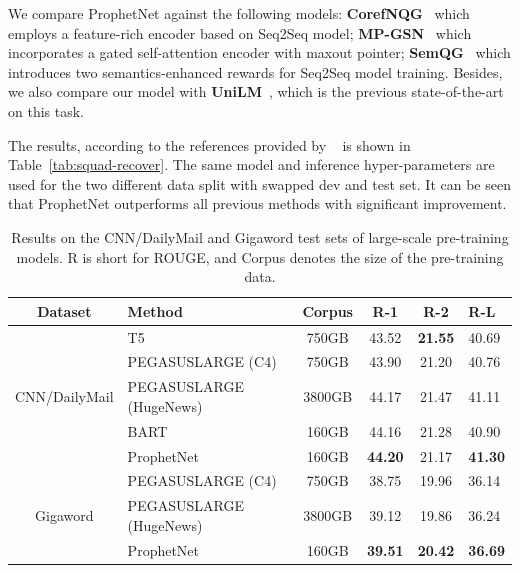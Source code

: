 \documentclass[11pt,a4paper]{article}
\begin{document}
We compare ProphetNet against the following models: \textbf{CorefNQG}~\cite{du2018harvesting} which employs a feature-rich encoder based on Seq2Seq model; \textbf{MP-GSN}~\cite{zhao2018paragraph} which incorporates a gated self-attention encoder with maxout pointer; \textbf{SemQG}~\cite{zhang2019addressing} which introduces two semantics-enhanced rewards for Seq2Seq model training.
Besides, we also compare our model with \textbf{UniLM}~\cite{dong2019unified}, which is the previous state-of-the-art on this task.

The results, according to the references provided by ~\citet{du2017learning} is shown in Table~\ref{tab:squad-recover}. The same model and inference hyper-parameters are used for the two different data split with swapped dev and test set. It can be seen that ProphetNet outperforms all previous methods with significant improvement. 

\begin{table}[htbp] 
\small
\begin{center}
\begin{tabular}{clcccl}
\toprule
Dataset & Method & Corpus & R-1 & R-2 & R-L\\
 \midrule
 \multirow{5}{*}{CNN/DailyMail}
  & T5~\cite{raffel2019exploring} & 750GB &  43.52  & \textbf{21.55} & 40.69\\
 & PEGASUSLARGE (C4)~\cite{zhang2019pegasus} & 750GB & 43.90 & 21.20 & 40.76\\
 & PEGASUSLARGE (HugeNews)~\cite{zhang2019pegasus} & 3800GB & 44.17 &21.47 &41.11\\
 & BART~\cite{lewis2019bart}& 160GB  & 44.16 & 21.28 & 40.90\\
 &ProphetNet & 160GB & \textbf{44.20} & 21.17 & \textbf{41.30}\\
 \midrule
 \multirow{3}{*}{Gigaword} & PEGASUSLARGE (C4)~\cite{zhang2019pegasus} & 750GB &   38.75  & 19.96   & 36.14\\
 &PEGASUSLARGE (HugeNews)~\cite{zhang2019pegasus} & 3800GB & 39.12  & 19.86   & 36.24\\
  &ProphetNet & 160GB & \textbf{39.51} & \textbf{20.42} & \textbf{36.69}\\ 
 \bottomrule
\end{tabular}
\end{center}
\caption{Results on the CNN/DailyMail and Gigaword test sets of large-scale pre-training models. R is short for ROUGE, and Corpus denotes the size of the pre-training data.}\label{tab:large} 
\end{table}
\end{document}
